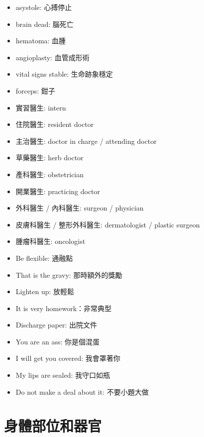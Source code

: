 \begin{multicols}{2}
\begin{itemize}
  \item asystole: 心搏停止
  \item brain dead: 腦死亡
  \item hematoma: 血腫
  \item angioplasty: 血管成形術
  \item vital signs stable: 生命跡象穩定
  \item forceps: 鉗子
\end{itemize}
\begin{itemize}
    \itemsep0em
    \item 實習醫生: intern
    \item 住院醫生: resident doctor 
    \item 主治醫生: doctor in charge / attending doctor 
    \item 草藥醫生: herb doctor
    \item 產科醫生: obstetrician
    \item 開業醫生: practicing doctor
    \item 外科醫生 / 內科醫生: surgeon / physician
    \item 皮膚科醫生 / 整形外科醫生: dermatologist / plastic surgeon
    \item 腫瘤科醫生: oncologist
\end{itemize}
\begin{itemize}
    \itemsep0em
    \item Be flexible: 通融點
    \item That is the gravy: 那時額外的獎勵
    \item Lighten up: 放輕鬆
    \item It is very homework：非常典型
  \item Discharge paper: 出院文件
    \item You are an ass: 你是個混蛋
    \item I will get you covered: 我會罩著你
    \item My lips are sealed: 我守口如瓶
    \item Do not make a deal about it: 不要小題大做
\end{itemize}
\end{multicols}

\section{身體部位和器官}
